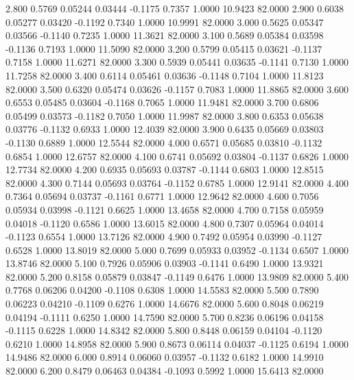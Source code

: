    2.800   0.5769   0.05244   0.03444  -0.1175   0.7357   1.0000  10.9423  82.0000
   2.900   0.6038   0.05277   0.03420  -0.1192   0.7340   1.0000  10.9991  82.0000
   3.000   0.5625   0.05347   0.03566  -0.1140   0.7235   1.0000  11.3621  82.0000
   3.100   0.5689   0.05384   0.03598  -0.1136   0.7193   1.0000  11.5090  82.0000
   3.200   0.5799   0.05415   0.03621  -0.1137   0.7158   1.0000  11.6271  82.0000
   3.300   0.5939   0.05441   0.03635  -0.1141   0.7130   1.0000  11.7258  82.0000
   3.400   0.6114   0.05461   0.03636  -0.1148   0.7104   1.0000  11.8123  82.0000
   3.500   0.6320   0.05474   0.03626  -0.1157   0.7083   1.0000  11.8865  82.0000
   3.600   0.6553   0.05485   0.03604  -0.1168   0.7065   1.0000  11.9481  82.0000
   3.700   0.6806   0.05499   0.03573  -0.1182   0.7050   1.0000  11.9987  82.0000
   3.800   0.6353   0.05638   0.03776  -0.1132   0.6933   1.0000  12.4039  82.0000
   3.900   0.6435   0.05669   0.03803  -0.1130   0.6889   1.0000  12.5544  82.0000
   4.000   0.6571   0.05685   0.03810  -0.1132   0.6854   1.0000  12.6757  82.0000
   4.100   0.6741   0.05692   0.03804  -0.1137   0.6826   1.0000  12.7734  82.0000
   4.200   0.6935   0.05693   0.03787  -0.1144   0.6803   1.0000  12.8515  82.0000
   4.300   0.7144   0.05693   0.03764  -0.1152   0.6785   1.0000  12.9141  82.0000
   4.400   0.7364   0.05694   0.03737  -0.1161   0.6771   1.0000  12.9642  82.0000
   4.600   0.7056   0.05934   0.03998  -0.1121   0.6625   1.0000  13.4658  82.0000
   4.700   0.7158   0.05959   0.04018  -0.1120   0.6586   1.0000  13.6015  82.0000
   4.800   0.7307   0.05964   0.04014  -0.1123   0.6554   1.0000  13.7126  82.0000
   4.900   0.7492   0.05954   0.03990  -0.1127   0.6528   1.0000  13.8019  82.0000
   5.000   0.7699   0.05933   0.03952  -0.1134   0.6507   1.0000  13.8746  82.0000
   5.100   0.7926   0.05906   0.03903  -0.1141   0.6490   1.0000  13.9321  82.0000
   5.200   0.8158   0.05879   0.03847  -0.1149   0.6476   1.0000  13.9809  82.0000
   5.400   0.7768   0.06206   0.04200  -0.1108   0.6308   1.0000  14.5583  82.0000
   5.500   0.7890   0.06223   0.04210  -0.1109   0.6276   1.0000  14.6676  82.0000
   5.600   0.8048   0.06219   0.04194  -0.1111   0.6250   1.0000  14.7590  82.0000
   5.700   0.8236   0.06196   0.04158  -0.1115   0.6228   1.0000  14.8342  82.0000
   5.800   0.8448   0.06159   0.04104  -0.1120   0.6210   1.0000  14.8958  82.0000
   5.900   0.8673   0.06114   0.04037  -0.1125   0.6194   1.0000  14.9486  82.0000
   6.000   0.8914   0.06060   0.03957  -0.1132   0.6182   1.0000  14.9910  82.0000
   6.200   0.8479   0.06463   0.04384  -0.1093   0.5992   1.0000  15.6413  82.0000

